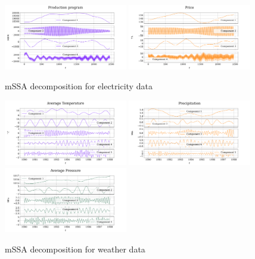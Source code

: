 		
		\begin{figure}[h]
			\centering
			\includegraphics[width=0.48\textwidth, keepaspectratio]{../../experiments/electricity/mssa/figs/decomposition/manual/grouping_1/Production_program.png}
			\includegraphics[width=0.48\textwidth, keepaspectratio]{../../experiments/electricity/mssa/figs/decomposition/manual/grouping_1/Price.png}
			\caption{mSSA decomposition for electricity data}\label{fig:electr_decomp_mssa}
		\end{figure}
		
		\begin{figure}[h]
			\centering
			\includegraphics[width=0.48\textwidth, keepaspectratio]{../../experiments/weather/mssa/figs/decomposition/manual/grouping_1/Average_Temperature.png}
			\includegraphics[width=0.48\textwidth, keepaspectratio]{../../experiments/weather/mssa/figs/decomposition/manual/grouping_1/Precipitation.png}
			\includegraphics[width=0.48\textwidth, keepaspectratio]{../../experiments/weather/mssa/figs/decomposition/manual/grouping_1/Average_Pressure.png}
			\caption{mSSA decomposition for weather data}\label{fig:weather_decomp_mssa}
		\end{figure}
		
		\clearpage
		\printbibliography
	
 